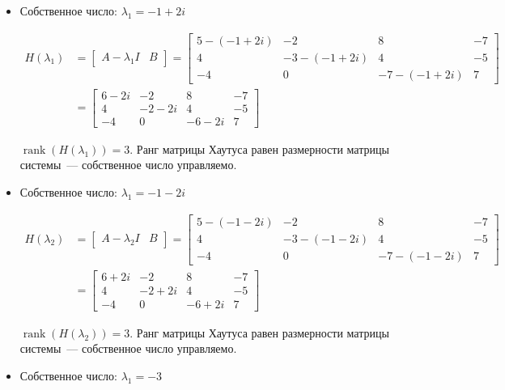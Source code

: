 \documentclass[a4paper,12pt]{article}
\begin{document}
	\begin{itemize}
		\item Собственное число: \(\lambda_1 = -1 + 2i\)
		
		\begin{align*}
			H(\lambda_1) &= \begin{bmatrix} A - \lambda_1 I & B \end{bmatrix} =
			\begin{bmatrix}
				5-(-1+2i) & -2 & 8 & -7 \\
				4 & -3-(-1+2i) & 4 & -5 \\
				-4 & 0 & -7-(-1+2i) & 7
			\end{bmatrix} \\[8pt]
			&=
			\begin{bmatrix}
				6-2i & -2 & 8 & -7 \\
				4 & -2-2i & 4 & -5 \\
				-4 & 0 & -6-2i & 7
			\end{bmatrix} 
		\end{align*}
		
		\(\operatorname{rank}(H(\lambda_1)) = 3\). Ранг матрицы Хаутуса равен размерности матрицы системы~--- собственное число управляемо.
		
		
		\item Собственное число: \(\lambda_1 = -1 -  2i\)
		
		\begin{align*}
			H(\lambda_2) &= \begin{bmatrix} A - \lambda_2 I & B \end{bmatrix} =
			\begin{bmatrix}
				5-(-1-2i) & -2 & 8 & -7 \\
				4 & -3-(-1-2i) & 4 & -5 \\
				-4 & 0 & -7-(-1-2i) & 7
			\end{bmatrix} \\[8pt]
			&=
			\begin{bmatrix}
				6+2i & -2 & 8 & -7 \\
				4 & -2+2i & 4 & -5 \\
				-4 & 0 & -6+2i & 7
			\end{bmatrix}
		\end{align*}
		
		\(\operatorname{rank}(H(\lambda_2)) = 3\). Ранг матрицы Хаутуса равен размерности матрицы системы~--- собственное число управляемо.
		
		\item Собственное число: \(\lambda_1 = -3\) 
		

\end{itemize}
\end{document}
